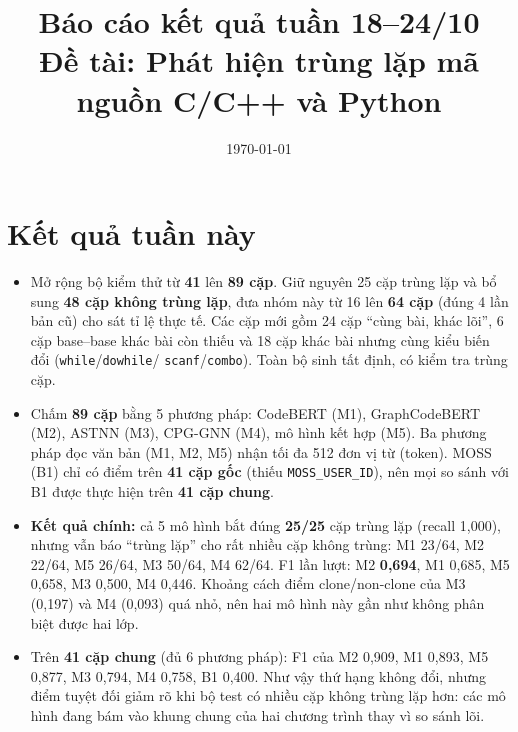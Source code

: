 \documentclass[11pt,a4paper]{article}
\title{\vspace{-1.2cm}\textbf{Báo cáo kết quả tuần 18--24/10}\\[4pt]
       {\normalsize Đề tài: Phát hiện trùng lặp mã nguồn C/C++ và Python}}
\date{\today}
\begin{document}
\maketitle
\vspace{-0.9cm}

\section{Kết quả tuần này}
\begin{itemize}
\item Mở rộng bộ kiểm thử từ \textbf{41} lên \textbf{89 cặp}. Giữ nguyên 25 cặp
  trùng lặp và bổ sung \textbf{48 cặp không trùng lặp}, đưa nhóm này từ 16 lên
  \textbf{64 cặp} (đúng 4 lần bản cũ) cho sát tỉ lệ thực tế. Các cặp mới gồm
  24 cặp ``cùng bài, khác lõi'', 6 cặp base--base khác bài còn thiếu và 18 cặp
  khác bài nhưng cùng kiểu biến đổi (\texttt{while}/\texttt{dowhile}/
  \texttt{scanf}/\texttt{combo}). Toàn bộ sinh tất định, có kiểm tra trùng cặp.
\item Chấm \textbf{89 cặp} bằng 5 phương pháp: CodeBERT (M1), GraphCodeBERT
  (M2), ASTNN (M3), CPG-GNN (M4), mô hình kết hợp (M5). Ba phương pháp đọc văn
  bản (M1, M2, M5) nhận tối đa 512 đơn vị từ (token). MOSS (B1) chỉ có điểm
  trên \textbf{41 cặp gốc} (thiếu \texttt{MOSS\_USER\_ID}), nên mọi so sánh
  với B1 được thực hiện trên \textbf{41 cặp chung}.
\item \textbf{Kết quả chính:} cả 5 mô hình bắt đúng \textbf{25/25} cặp trùng lặp
  (recall 1,000), nhưng vẫn báo ``trùng lặp'' cho rất nhiều cặp không trùng:
  M1 23/64, M2 22/64, M5 26/64, M3 50/64, M4 62/64. F1 lần lượt: M2
  \textbf{0,694}, M1 0,685, M5 0,658, M3 0,500, M4 0,446. Khoảng cách điểm
  clone/non-clone của M3 (0,197) và M4 (0,093) quá nhỏ, nên hai mô hình này
  gần như không phân biệt được hai lớp.
\item Trên \textbf{41 cặp chung} (đủ 6 phương pháp): F1 của M2 0,909, M1 0,893,
  M5 0,877, M3 0,794, M4 0,758, B1 0,400. Như vậy thứ hạng không đổi, nhưng
  điểm tuyệt đối giảm rõ khi bộ test có nhiều cặp không trùng lặp hơn: các mô
  hình đang bám vào khung chung của hai chương trình thay vì so sánh lõi.
\end{itemize}

\end{document}
